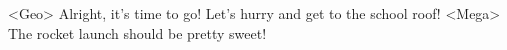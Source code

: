 <Geo> Alright, it's time to go! Let's hurry and get to the school roof! 
<Mega> The rocket launch should be pretty sweet! 
